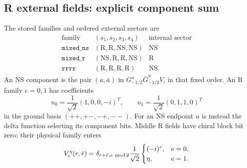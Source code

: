\documentclass[11pt]{article}
\newcommand{\NS}{\mathrm{NS}}
\newcommand{\R}{\mathrm{R}}
\begin{document}
\subsection{R external fields: explicit component sum}
The stored families and ordered external sectors are
\[
\begin{array}{c|c|c}
 \text{family}&(s_1,s_2,s_3,s_4)&\text{internal sector}\\ \hline
 \texttt{mixed\_ns}&(\R,\R,\NS,\NS)&\NS\\
 \texttt{mixed\_r}&(\NS,\R,\R,\NS)&\R\\
 \texttt{rrrr}&(\R,\R,\R,\R)&\NS .
\end{array}
\]
An NS component is the pair \((a,\bar a)\) in
\(G_{-1/2}^{a}\bar G_{-1/2}^{\bar a}V\), in that fixed order.
An R family \(e=0,1\) has coefficients
\begin{equation}
 u_0=\frac1{\sqrt2}(1,0,0,-i)^T,\qquad
 u_1=\frac1{\sqrt2}(0,1,1,0)^T
 \label{eq:Rstates}
\end{equation}
in the ground basis \((++,+-,-+,--)\).
For an NS endpoint \(u\) is instead the delta function selecting its
component bits. Middle R fields have chiral block bit zero; their
physical family enters
\begin{equation}
 V_e^\eta(r,\bar r)=\delta_{r+\bar r,e\ {\rm mod}\,2}\frac1{\sqrt2}
 \begin{cases}(-i)^r,&e=0,\\ \eta,&e=1.\end{cases}
 \label{eq:Rvertex}
\end{equation}
\end{document}
